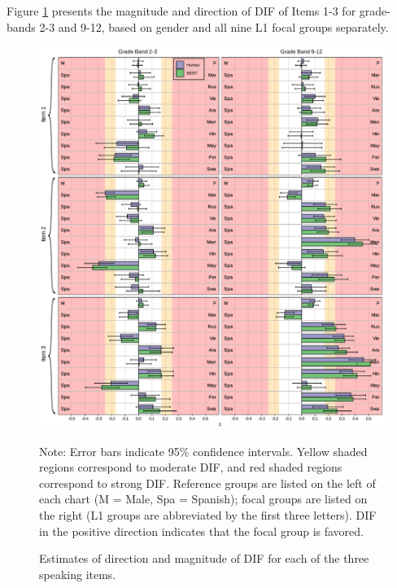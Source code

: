 \documentclass [PhD] {uclathes}
\begin{document}
Figure \ref{fig:z_itm} presents the magnitude and direction of DIF of Items 1-3 for grade-bands 2-3 and 9-12, based on gender and all nine L1 focal groups separately.

\begin{figure}[t]
    \centering
    \caption{Estimates of direction and magnitude of DIF for each of the three speaking items.}
    \includegraphics[width=16cm]{figures/20230504_ETS-DIF_BERT_z_itm_edit.pdf}
    \label{fig:z_itm}
{\newline Note: Error bars indicate 95\% confidence intervals. Yellow shaded regions correspond to moderate DIF, and red shaded regions correspond to strong DIF. Reference groups are listed on the left of each chart (M = Male, Spa = Spanish); focal groups are listed on the right (L1 groups are abbreviated by the first three letters). DIF in the positive direction indicates that the focal group is favored. \par}
\end{figure}


%
%
%

\end{document}
